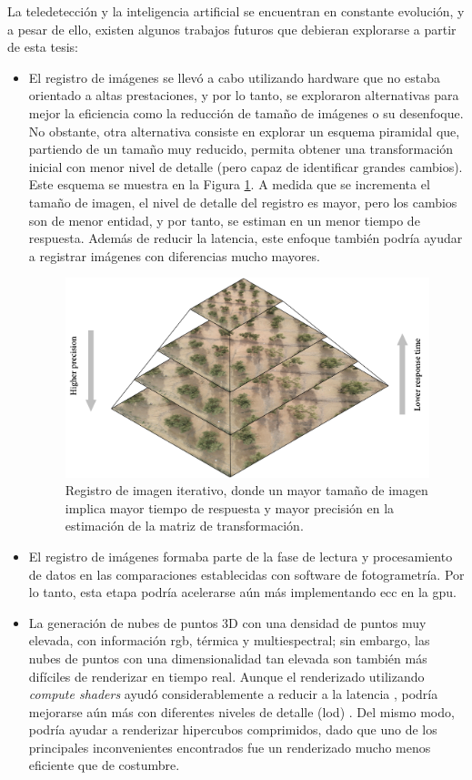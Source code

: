 La teledetección y la inteligencia artificial se encuentran en constante evolución, y a pesar de ello, existen algunos trabajos futuros que debieran explorarse a partir de esta tesis:
\begin{itemize}
    \item El registro de imágenes se llevó a cabo utilizando hardware que no estaba orientado a altas prestaciones, y por lo tanto, se exploraron alternativas para mejor la eficiencia como la reducción de tamaño de imágenes o su desenfoque. No obstante, otra alternativa consiste en explorar un esquema piramidal que, partiendo de un tamaño muy reducido, permita obtener una transformación inicial con menor nivel de detalle (pero capaz de identificar grandes cambios). Este esquema se muestra en la Figura \ref{fig:image_pyramid_spanish}. A medida que se incrementa el tamaño de imagen, el nivel de detalle del registro es mayor, pero los cambios son de menor entidad, y por tanto, se estiman en un menor tiempo de respuesta. Además de reducir la latencia, este enfoque también podría ayudar a registrar imágenes con diferencias mucho mayores.
    \begin{figure}
        \centering
        \includegraphics[width=\linewidth]{figs/conclusions/image_pyramid.png}
        \caption{Registro de imagen iterativo, donde un mayor tamaño de imagen implica mayor tiempo de respuesta y mayor precisión en la estimación de la matriz de transformación.}
        \label{fig:image_pyramid_spanish}
    \end{figure}
    \item El registro de imágenes formaba parte de la fase de lectura y procesamiento de datos en las comparaciones establecidas con software de fotogrametría. Por lo tanto, esta etapa podría acelerarse aún más implementando \acrshort{ecc} en la \acrshort{gpu}.
    \item La generación de nubes de puntos 3D con una densidad de puntos muy elevada, con información \acrshort{rgb}, térmica y multiespectral; sin embargo, las nubes de puntos con una dimensionalidad tan elevada son también más difíciles de renderizar en tiempo real. Aunque el renderizado utilizando \textit{compute shaders} ayudó considerablemente a reducir a la latencia \cite{schutz_rendering_2021}, podría mejorarse aún más con diferentes niveles de detalle (\acrshort{lod}) \cite{schutz_gpu-accelerated_2023}. Del mismo modo, podría ayudar a renderizar hipercubos comprimidos, dado que uno de los principales inconvenientes encontrados fue un renderizado mucho menos eficiente que de costumbre.

\end{itemize}
